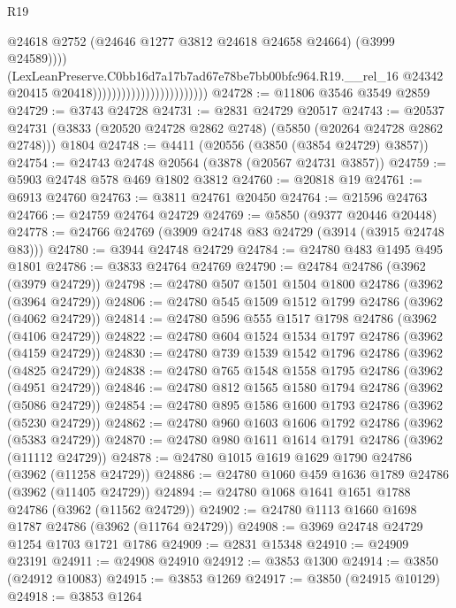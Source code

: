 \begin{lexlean}{R19}
\begin{coremodule}
                                                        @24618
                                                        @2752
                                                        (@24646 @1277 @3812 @24618 @24658 @24664)
                                                        (@3999 @24589))))
                                                  (LexLeanPreserve.C0bb16d7a17b7ad67e78be7bb00bfc964.R19.__rel_16
                                                    @24342
                                                    @20415
                                                    @20418))))))))))))))))))))))))
@24728 := @11806 @3546 @3549 @2859
@24729 := @3743 @24728
@24731 := @2831 @24729 @20517
@24743 := @20537
    @24731
    (@3833 (@20520 @24728 @2862 @2748) (@5850 (@20264 @24728 @2862 @2748)))
    @1804
@24748 := @4411 (@20556 (@3850 (@3854 @24729) @3857))
@24754 := @24743 @24748 @20564 (@3878 (@20567 @24731 @3857))
@24759 := @5903 @24748 @578 @469 @1802 @3812
@24760 := @20818 @19
@24761 := @6913 @24760
@24763 := @3811 @24761 @20450
@24764 := @21596 @24763
@24766 := @24759 @24764 @24729
@24769 := @5850 (@9377 @20446 @20448)
@24778 := @24766 @24769 (@3909 @24748 @83 @24729 (@3914 (@3915 @24748 @83)))
@24780 := @3944 @24748 @24729
@24784 := @24780 @483 @1495 @495 @1801
@24786 := @3833 @24764 @24769
@24790 := @24784 @24786 (@3962 (@3979 @24729))
@24798 := @24780 @507 @1501 @1504 @1800 @24786 (@3962 (@3964 @24729))
@24806 := @24780 @545 @1509 @1512 @1799 @24786 (@3962 (@4062 @24729))
@24814 := @24780 @596 @555 @1517 @1798 @24786 (@3962 (@4106 @24729))
@24822 := @24780 @604 @1524 @1534 @1797 @24786 (@3962 (@4159 @24729))
@24830 := @24780 @739 @1539 @1542 @1796 @24786 (@3962 (@4825 @24729))
@24838 := @24780 @765 @1548 @1558 @1795 @24786 (@3962 (@4951 @24729))
@24846 := @24780 @812 @1565 @1580 @1794 @24786 (@3962 (@5086 @24729))
@24854 := @24780 @895 @1586 @1600 @1793 @24786 (@3962 (@5230 @24729))
@24862 := @24780 @960 @1603 @1606 @1792 @24786 (@3962 (@5383 @24729))
@24870 := @24780 @980 @1611 @1614 @1791 @24786 (@3962 (@11112 @24729))
@24878 := @24780 @1015 @1619 @1629 @1790 @24786 (@3962 (@11258 @24729))
@24886 := @24780 @1060 @459 @1636 @1789 @24786 (@3962 (@11405 @24729))
@24894 := @24780 @1068 @1641 @1651 @1788 @24786 (@3962 (@11562 @24729))
@24902 := @24780 @1113 @1660 @1698 @1787 @24786 (@3962 (@11764 @24729))
@24908 := @3969 @24748 @24729 @1254 @1703 @1721 @1786
@24909 := @2831 @15348
@24910 := @24909 @23191
@24911 := @24908 @24910
@24912 := @3853 @1300
@24914 := @3850 (@24912 @10083)
@24915 := @3853 @1269
@24917 := @3850 (@24915 @10129)
@24918 := @3853 @1264

\end{coremodule}
\end{lexlean}

